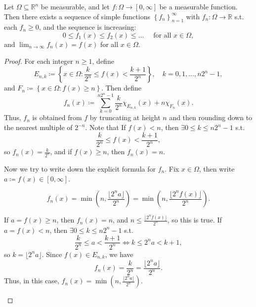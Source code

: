 \begin{lemma} \label{lm: use simple function approach measurable function}
    Let \(\Omega \subseteq \mathbb{R} ^n\) be measurable, and let \(f: \Omega \to [0, \infty]\) be a measurable function. Then there exists a sequence of simple functions \(\left\{ f_n \right\}_{n=1}^{\infty}  \) with \(f_n: \Omega \to \mathbb{R}\) s.t. each \(f_n \ge 0\), and the sequence is increasing:
    \[
        0 \le f_1(x) \le f_2(x) \le \dots \quad \text{ for all } x \in \Omega, 
    \]     
    and \(\lim_{n \to \infty} f_n(x) = f(x) \) for all \(x \in \Omega\).  
\end{lemma}

\begin{proof}
    For each integer \(n \ge 1\), define 
    \[
        E_{n, k} \coloneqq \left\{ x \in \Omega: \frac{k}{2^n} \le f(x) < \frac{k+1}{2^n} \right\}, \quad k = 0, 1, \dots , n 2^n - 1,
    \] 
    and \(F_n \coloneqq \left\{ x \in \Omega: f(x) \ge n \right\} \). Then define 
    \[
        f_n(x) \coloneqq \sum_{k=0}^{n 2^n - 1} \frac{k}{2^n} \chi _{E_{n, k}} (x) + n \chi_{F_n}(x).
    \]
    Thus, \(f_n\) is obtained from \(f\) by truncating at height \(n\) and then rounding down to the nearest multiple of \(2^{-n}\). Note that If \(f(x) < n\), then \(\exists 0 \le k \le n2^n - 1\) s.t.
    \[
        \frac{k}{2^n} \le f(x) < \frac{k+1}{2^n},
    \]      
    so \(f_n(x) = \frac{k}{2^n}\), and if \(f(x) \ge n\), then \(f_n(x) = n\). 

    Now we try to write down the explicit formula for \(f_n\). Fix \(x \in \Omega \), then write \(a \coloneqq f(x) \in [0, \infty]\).

    \begin{claim}
        \[
            f_n(x) = \min \left( n, \frac{\lfloor 2^n a \rfloor}{2^n} \right) = \min \left( n, \frac{\lfloor 2^n f(x) \rfloor}{2^n} \right).   
        \]
    \end{claim}
    \begin{explanation}
        If \(a = f(x) \ge n\), then \(f_n(x) = n\), and \(n \le \frac{\lfloor 2^n f(x) \rfloor}{2^n}\), so this is true. If \(a = f(x) < n\), then \(\exists 0 \le k \le n 2^n - 1\) s.t. 
        \[
            \frac{k}{2^n} \le a < \frac{k + 1}{2^n} \iff k \le 2^n a < k + 1,
        \]     
        so \(k = \lfloor 2^n a \rfloor\). Since \(f(x) \in E_{n, k}\), we have 
        \[
            f_n(x) = \frac{k}{2^n} = \frac{\lfloor 2^n a \rfloor}{2^n}.
        \] 
        Thus, in this case, \(f_n(x) = \min \left( n, \frac{\lfloor 2^n a \rfloor}{2^n} \right) \).  


\end{explanation}
\end{proof}
